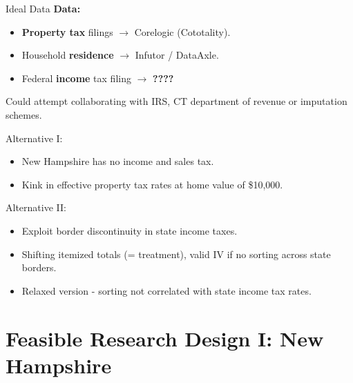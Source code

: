 \documentclass[10pt, aspectratio=169]{beamer}
\begin{document}
\begin{frame}{Ideal Data}
    \textbf{Data:}
    \begin{itemize}
        \item[(i)] \textbf{Property tax} filings $\rightarrow$ {\color{specialgreen}Corelogic (Cototality)}.
        \item[(ii)] Household \textbf{residence} $\rightarrow$ {\color{specialgreen}Infutor / DataAxle}.
        \item[(iii)] Federal \textbf{income} tax filing $\rightarrow$ \alert{\textbf{????}}
    \end{itemize}

    Could attempt collaborating with IRS, CT department of revenue or imputation schemes.\\
    \vspace{.5cm}

    \begin{block}{\color{specialgreen} Alternative I:}
        \begin{itemize}
            \item New Hampshire has no income and sales tax.
            \item Kink in effective property tax rates at home value of \$10,000.
        \end{itemize}
    \end{block}
    \begin{block}{\color{specialgreen}Alternative II:}
        \begin{itemize}
            \item Exploit border discontinuity in state income taxes.
            \item Shifting itemized totals (= treatment), valid IV if no sorting across state borders.
            \item Relaxed version - sorting not correlated with state income tax rates.
        \end{itemize}
    \end{block}
\end{frame}

\section{Feasible Research Design I: New Hampshire}
\end{document}
